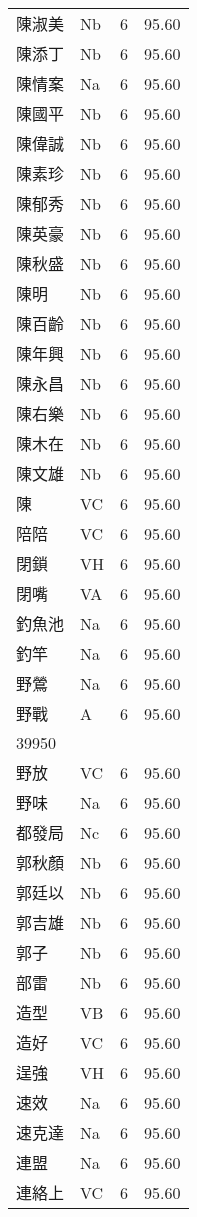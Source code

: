 \documentclass[twocolumn]{book}
\begin{document}
\begin{supertabular}{llrr}
陳淑美 & Nb & 6 &  95.60\\
陳添丁 & Nb & 6 &  95.60\\
陳情案 & Na & 6 &  95.60\\
陳國平 & Nb & 6 &  95.60\\
陳偉誠 & Nb & 6 &  95.60\\
陳素珍 & Nb & 6 &  95.60\\
陳郁秀 & Nb & 6 &  95.60\\
陳英豪 & Nb & 6 &  95.60\\
陳秋盛 & Nb & 6 &  95.60\\
陳明 & Nb & 6 &  95.60\\
陳百齡 & Nb & 6 &  95.60\\
陳年興 & Nb & 6 &  95.60\\
陳永昌 & Nb & 6 &  95.60\\
陳右樂 & Nb & 6 &  95.60\\
陳木在 & Nb & 6 &  95.60\\
陳文雄 & Nb & 6 &  95.60\\
陳 & VC & 6 &  95.60\\
陪陪 & VC & 6 &  95.60\\
閉鎖 & VH & 6 &  95.60\\
閉嘴 & VA & 6 &  95.60\\
釣魚池 & Na & 6 &  95.60\\
釣竿 & Na & 6 &  95.60\\
野鶯 & Na & 6 &  95.60\\
野戰 & A & 6 &  95.60\\
39950\\
野放 & VC & 6 &  95.60\\
野味 & Na & 6 &  95.60\\
都發局 & Nc & 6 &  95.60\\
郭秋顏 & Nb & 6 &  95.60\\
郭廷以 & Nb & 6 &  95.60\\
郭吉雄 & Nb & 6 &  95.60\\
郭子 & Nb & 6 &  95.60\\
部雷 & Nb & 6 &  95.60\\
造型 & VB & 6 &  95.60\\
造好 & VC & 6 &  95.60\\
逞強 & VH & 6 &  95.60\\
速效 & Na & 6 &  95.60\\
速克達 & Na & 6 &  95.60\\
連盟 & Na & 6 &  95.60\\
連絡上 & VC & 6 &  95.60\\

\end{supertabular}
\end{document}
